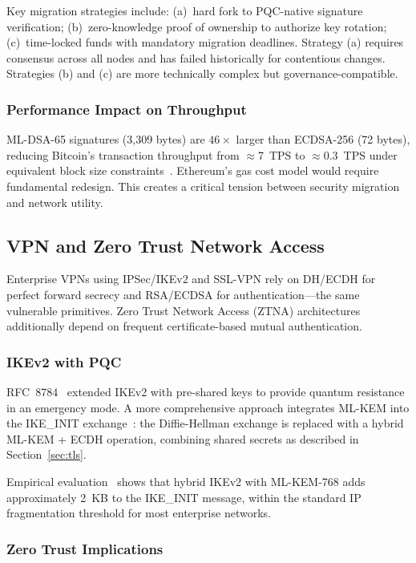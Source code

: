 \documentclass[journal]{IEEEtran}
\begin{document}
Key migration strategies include: (a)~hard fork to PQC-native signature
verification; (b)~zero-knowledge proof of ownership to authorize key rotation;
(c)~time-locked funds with mandatory migration deadlines. Strategy (a) requires
consensus across all nodes and has failed historically for contentious changes.
Strategies (b) and (c) are more technically complex but governance-compatible.

\subsubsection{Performance Impact on Throughput}

ML-DSA-65 signatures (3,309 bytes) are $46\times$ larger than ECDSA-256 (72 bytes),
reducing Bitcoin's transaction throughput from $\approx$7~TPS to $\approx$0.3~TPS
under equivalent block size constraints~\cite{chen2021blockchain}. Ethereum's
gas cost model would require fundamental redesign. This creates a critical
tension between security migration and network utility.

\subsection{VPN and Zero Trust Network Access}
\label{sec:vpn}

Enterprise VPNs using IPSec/IKEv2 and SSL-VPN rely on DH/ECDH for perfect
forward secrecy and RSA/ECDSA for authentication---the same vulnerable
primitives. Zero Trust Network Access (ZTNA) architectures additionally depend
on frequent certificate-based mutual authentication.

\subsubsection{IKEv2 with PQC}

RFC~8784~\cite{rfc8784} extended IKEv2 with pre-shared keys to provide
quantum resistance in an emergency mode. A more comprehensive approach
integrates ML-KEM into the IKE\_INIT exchange~\cite{rfc8784}:
the Diffie-Hellman exchange is replaced with a hybrid ML-KEM + ECDH operation,
combining shared secrets as described in Section~\ref{sec:tls}.

Empirical evaluation~\cite{sikeridis2020pqc} shows that hybrid IKEv2 with
ML-KEM-768 adds approximately 2~KB to the IKE\_INIT message, within the
standard IP fragmentation threshold for most enterprise networks.

\subsubsection{Zero Trust Implications}
\end{document}
